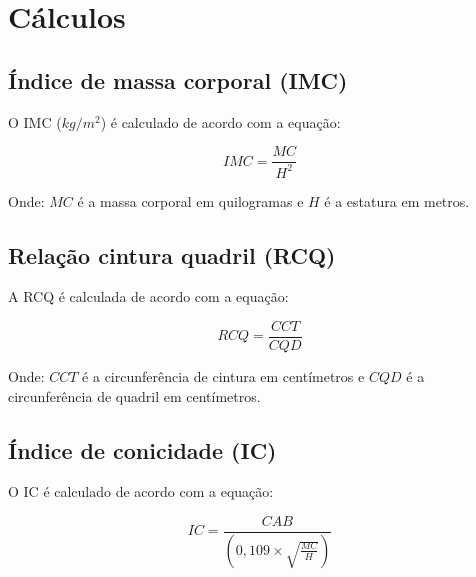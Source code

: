 \documentclass[a4paper,12pt]{report}
\begin{document}
        \section{Cálculos}

            \subsection{Índice de massa corporal (IMC)}
            O IMC ($kg/m^2$) é calculado de acordo com a equação:

            \begin{equation}
            \label{eqn:imc}
            IMC=\frac{MC}{H^2}
            \end{equation}

            Onde: $MC$ é a massa corporal em quilogramas e $H$ é a
            estatura em metros.

            \subsection{Relação cintura quadril (RCQ)}
            A RCQ é calculada de acordo com a equação:

            \begin{equation}
            \label{eqn:rcq}
            RCQ=\frac{CCT}{CQD}
            \end{equation}

            Onde: $CCT$ é a circunferência de cintura em centímetros e $CQD$
            é a circunferência de quadril em centímetros.
            
            \subsection{Índice de conicidade (IC)}
            O IC é calculado de acordo com a equação:
            
            \begin{equation}
            \label{eqn:ic}
            IC=\frac{CAB}{(0,109\times\sqrt{\frac{MC}{H}})}
            \end{equation}
\end{document}
